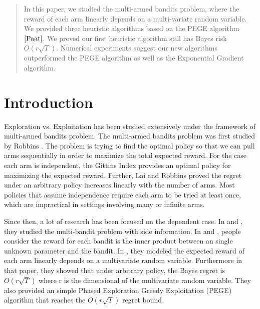 \documentclass{article}
\theoremstyle{plain}
\theoremstyle{definition}
\begin{document}
 

\begin{abstract} 
In this paper, we studied the multi-armed bandits problem, where the reward of each arm linearly depends on a multi-variate random variable. We provided three heuristic algorithms based on the PEGE algorithm $\cite{Paat}$. We proved our first heuristic algorithm still has Bayes risk $O(r\sqrt{T})$. Numerical experiments suggest our new algorithms outperformed the PEGE algorithm as well as the Exponential Gradient algorithm. 
\end{abstract} 


\section{Introduction}

Exploration vs. Exploitation has been studied extensively under the framework of multi-armed bandits problem. The multi-armed bandits problem was first studied by Robbins \cite{Robbins}. The problem is trying to find the optimal policy so that we can pull arms sequentially in order to maximize the total expected reward. For the case each arm is independent, the Gittins Index \cite{Gittins} provides an optimal policy for maximizing the expected reward. Further, Lai and Robbins \cite{Lai} proved the regret under an arbitrary policy increases linearly with the number of arms. Most policies that assume independence require each arm to be tried at least once, which are impractical in settings involving many or infinite arms. 

Since then, a lot of research has been focused on the dependent case. In \cite{Gabor} and \cite{Chih-Chun}, they studied the multi-bandit problem with side information. In \cite{Yasin1} and \cite{Yasin2}, people consider the reward for each bandit is the inner product between an single unknown parameter and the bandit. In \cite{Paat}, they modeled the expected reward of each arm linearly depends on a multivariate random variable. Furthermore in that paper, they showed that under arbitrary policy, the Bayes regret is $O(r\sqrt{T})$ where r is the dimensional of the multivariate random variable. They also provided an simple Phased Exploration Greedy Exploitation (PEGE) algorithm that reaches the $O(r\sqrt{T})$ regret bound.
\end{document}
